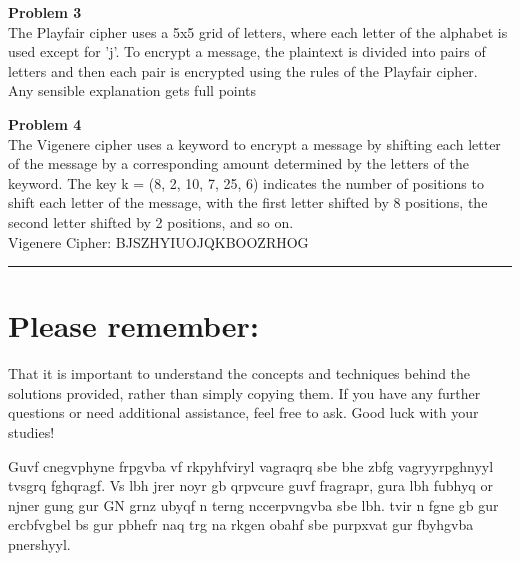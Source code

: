 \documentclass[a4paper, 11pt]{article}
\newenvironment{problem}[2][Problem]
    { \begin{mdframed}[backgroundcolor=gray!20] \textbf{#1 #2} \\}
    {  \end{mdframed}}
\begin{document}
\begin{problem}{3}
The Playfair cipher uses a 5x5 grid of letters, where each letter of the alphabet is used except for 'j'. To encrypt a message, the plaintext is divided into pairs of letters and then each pair is encrypted using the rules of the Playfair cipher.\\
Any sensible explanation gets full points
\end{problem}
\begin{problem}{4}
The Vigenere cipher uses a keyword to encrypt a message by shifting each letter of the message by a corresponding amount determined by the letters of the keyword. The key k = (8, 2, 10, 7, 25, 6) indicates the number of positions to shift each letter of the message, with the first letter shifted by 8 positions, the second letter shifted by 2 positions, and so on.\\
Vigenere Cipher: BJSZHYIUOJQKBOOZRHOG
\end{problem}
\noindent\rule{7in}{2.8pt}
\section*{Please remember:}
\item That it is important to understand the concepts and techniques behind the solutions provided, rather than simply copying them. If you have any further questions or need additional assistance, feel free to ask. Good luck with your studies!\\
\item Guvf cnegvphyne frpgvba vf rkpyhfviryl vagraqrq sbe bhe zbfg vagryyrpghnyyl tvsgrq fghqragf. Vs lbh jrer noyr gb qrpvcure guvf fragrapr, gura lbh fubhyq or njner gung gur GN grnz ubyqf n terng nccerpvngvba sbe lbh. tvir n fgne gb gur ercbfvgbel bs gur pbhefr naq trg na rkgen obahf sbe purpxvat gur fbyhgvba pnershyyl.
\end{document}
